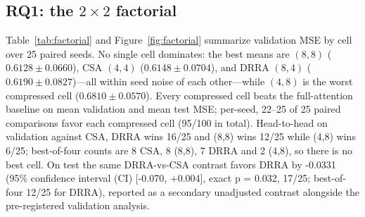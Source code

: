 \subsection{RQ1: the $2\times2$ factorial}
\label{sec:rq1}
Table~\ref{tab:factorial} and Figure~\ref{fig:factorial} summarize
validation MSE by cell over 25 paired seeds. No single cell dominates: the best
means are $(8,8)$ ($0.6128 \pm 0.0660$), CSA $(4,4)$ ($0.6148 \pm 0.0704$), and
DRRA $(8,4)$ ($0.6190 \pm 0.0827$)---all within seed noise of each other---while
$(4,8)$ is the worst compressed cell ($0.6810 \pm 0.0570$). Every compressed cell
beats the full-attention baseline on mean validation and mean test MSE; per-seed,
22--25 of 25 paired comparisons favor each compressed cell (95/100 in total). Head-to-head on validation against CSA, DRRA wins 16/25 and (8,8) wins 12/25 while (4,8) wins 6/25; best-of-four counts are 8 CSA, 8 (8,8), 7 DRRA and 2 (4,8), so there is no best cell. On test the same DRRA-vs-CSA contrast favors DRRA by -0.0331 (95\% confidence interval (CI) [-0.070, +0.004], exact p = 0.032, 17/25; best-of-four 12/25 for DRRA), reported as a secondary unadjusted contrast alongside the pre-registered validation analysis.

